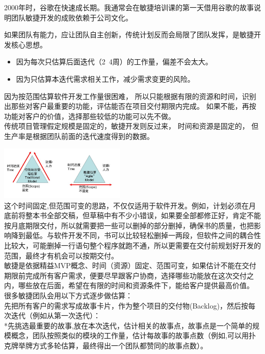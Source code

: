 2000年时，谷歌在快速成长期。我通常会在敏捷培训课的第一天借用谷歌的故事说明团队敏捷开发的成败依赖于公司文化。

如果团队有能力，应让团队自主创新，传统计划反而会局限了团队发挥，是敏捷开发核心思想。

\begin{itemize}
\tightlist
\item
  因为每次只估算后面迭代（2~4周）的工作量，偏差不会太大。
\item
  因为只估算本迭代需求相关工作，减少需求变更的风险。
\end{itemize}

因为按范围估算软件开发工作量很困难，
所以只能根据有限的资源和时间，识别出那些对客户最重要的功能，评估能否在项目交付期限内完成。
如果不能，再按功能对客户的价值，选择那些较低的功能可以先不做。\\
传统项目管理假定规模是固定的，敏捷开发则反过来， 时间和资源是固定的，
但生产率是根据团队前面的迭代速度得到的数据。


\includegraphics[width=6cm]{微信图片_20230105131327.jpg}\\

这个时间固定,但范围可变的思路，不仅仅适用于软件开发。例如，计划必须在月底前将整本书全部交稿，但草稿中有不少小错误，如果要全部都修正好，肯定不能按月底期限交付，所以就需要把一些可以删掉的部分删掉，确保书的质量，也把影响降到最低。与软件开发不同，书可以比较轻松删掉一两段，但软件之间的耦合性比较大，可能删掉一行语句整个程序就跑不通，所以更需要在交付前规划好开发的范围，最终才有机会可以按期交付。\\
敏捷是依据精益MVP概念、时间（资源）固定、范围可变，如果估计不能在交付期限前完成所有客户需求，便要尽早跟客户协商，选择哪些功能放在这次交付之内，哪些放在后面，希望在有限的时间和资源条件下，能给客户提供最高价值。
很多敏捷团队会用以下方式逐步做估算：\\
先把所有客户的需求写成故事卡片，作为整个项目的交付物(Backlog)，然后按每次迭代（例如从第一次迭代）：\\
*先挑选最重要的故事,放在本次迭代，估计相关的故事点，故事点是一个简单的规模概念，团队按照类似的模块的工作量，估计每故事的故事点数（例如,可以用扑克牌举牌方式多轮估算，最终得出一个团队都赞同的故事点数）。

